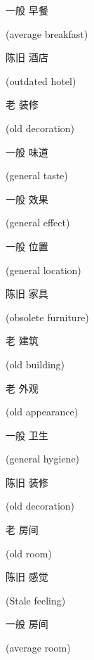 \begin{CJK}{UTF8}{gbsn}一般 早餐\end{CJK} (average breakfast)
\begin{CJK}{UTF8}{gbsn}陈旧 酒店\end{CJK} (outdated hotel)
\begin{CJK}{UTF8}{gbsn}老 装修\end{CJK} (old decoration)
\begin{CJK}{UTF8}{gbsn}一般 味道\end{CJK} (general taste)
\begin{CJK}{UTF8}{gbsn}一般 效果\end{CJK} (general effect)
\begin{CJK}{UTF8}{gbsn}一般 位置\end{CJK} (general location)
\begin{CJK}{UTF8}{gbsn}陈旧 家具\end{CJK} (obsolete furniture)
\begin{CJK}{UTF8}{gbsn}老 建筑\end{CJK} (old building)
\begin{CJK}{UTF8}{gbsn}老 外观\end{CJK} (old appearance)
\begin{CJK}{UTF8}{gbsn}一般 卫生\end{CJK} (general hygiene)
\begin{CJK}{UTF8}{gbsn}陈旧 装修\end{CJK} (old decoration)
\begin{CJK}{UTF8}{gbsn}老 房间\end{CJK} (old room)
\begin{CJK}{UTF8}{gbsn}陈旧 感觉\end{CJK} (Stale feeling)
\begin{CJK}{UTF8}{gbsn}一般 房间\end{CJK} (average room)
